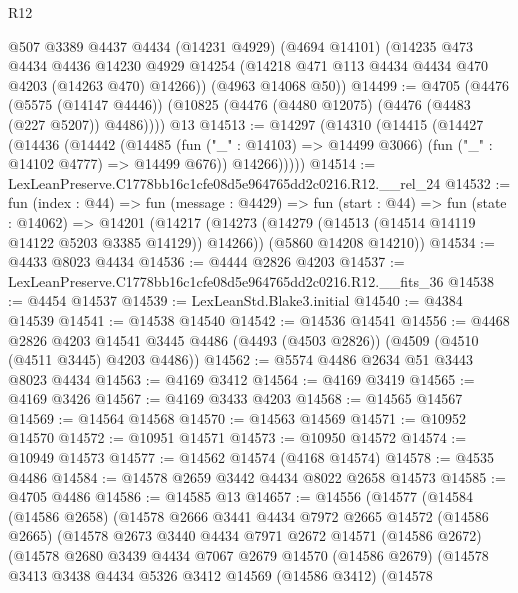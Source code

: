 \begin{lexlean}{R12}
\begin{coremodule}
      @507
      @3389
      @4437
      @4434
      (@14231 @4929)
      (@4694 @14101)
      (@14235
        @473
        @4434
        @4436
        @14230
        @4929
        @14254
        (@14218 @471 @113 @4434 @4434 @470 @4203 (@14263 @470) @14266))
      (@4963 @14068 @50))
@14499 := @4705
    (@4476
      (@5575 (@14147 @4446))
      (@10825 (@4476 (@4480 @12075) (@4476 (@4483 (@227 @5207)) @4486))))
    @13
@14513 := @14297
    (@14310
      (@14415
        (@14427
          (@14436
            (@14442
              (@14485
                (fun ("_" : @14103) => @14499 @3066)
                (fun ("_" : @14102 @4777) => @14499 @676))
              @14266)))))
@14514 := LexLeanPreserve.C1778bb16c1cfe08d5e964765dd2c0216.R12.__rel_24
@14532 := fun (index : @44) =>
  fun (message : @4429) =>
  fun (start : @44) =>
  fun (state : @14062) =>
  @14201
    (@14217
      (@14273 (@14279 (@14513 (@14514 @14119 @14122 @5203 @3385 @14129)) @14266))
      (@5860 @14208 @14210))
@14534 := @4433 @8023 @4434
@14536 := @4444 @2826 @4203
@14537 := LexLeanPreserve.C1778bb16c1cfe08d5e964765dd2c0216.R12.__fits_36
@14538 := @4454 @14537
@14539 := LexLeanStd.Blake3.initial
@14540 := @4384 @14539
@14541 := @14538 @14540
@14542 := @14536 @14541
@14556 := @4468
    @2826
    @4203
    @14541
    @3445
    @4486
    (@4493 (@4503 @2826))
    (@4509 (@4510 (@4511 @3445) @4203 @4486))
@14562 := @5574 @4486 @2634 @51 @3443 @8023 @4434
@14563 := @4169 @3412
@14564 := @4169 @3419
@14565 := @4169 @3426
@14567 := @4169 @3433 @4203
@14568 := @14565 @14567
@14569 := @14564 @14568
@14570 := @14563 @14569
@14571 := @10952 @14570
@14572 := @10951 @14571
@14573 := @10950 @14572
@14574 := @10949 @14573
@14577 := @14562 @14574 (@4168 @14574)
@14578 := @4535 @4486
@14584 := @14578 @2659 @3442 @4434 @8022 @2658 @14573
@14585 := @4705 @4486
@14586 := @14585 @13
@14657 := @14556
    (@14577
      (@14584
        (@14586 @2658)
        (@14578
          @2666
          @3441
          @4434
          @7972
          @2665
          @14572
          (@14586 @2665)
          (@14578
            @2673
            @3440
            @4434
            @7971
            @2672
            @14571
            (@14586 @2672)
            (@14578
              @2680
              @3439
              @4434
              @7067
              @2679
              @14570
              (@14586 @2679)
              (@14578
                @3413
                @3438
                @4434
                @5326
                @3412
                @14569
                (@14586 @3412)
                (@14578

\end{coremodule}
\end{lexlean}
